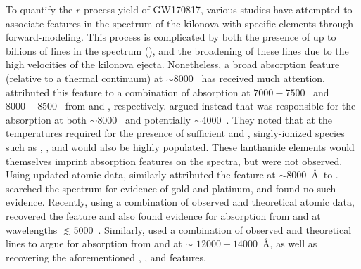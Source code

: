 \documentclass[twocolumn, twocolappendix]{aastex63}
\begin{document}
To quantify the $r$-process yield of GW170817, various studies have attempted to associate features in the spectrum of the kilonova with specific elements through forward-modeling. This process is complicated by both the presence of up to billions of lines in the spectrum (\citealt{tanaka20}), and the broadening of these lines due to the high velocities of the kilonova ejecta. Nonetheless, a broad absorption feature (relative to a thermal continuum) at $\sim$8000~\text{\AA} has received much attention. \cite{smartt17} attributed this feature to a combination of absorption at $7000-7500$~\text{\AA} and $8000-8500$~\text{\AA} from  and , respectively. \cite{watson19} argued instead that  was responsible for the absorption at both $\sim$8000~\text{\AA} and potentially $\sim$4000~\text{\AA}. They noted that at the temperatures required for the presence of sufficient  and , singly-ionized species such as , , and  would also be highly populated. These lanthanide elements would themselves imprint absorption features on the spectra, but were not observed. Using updated atomic data, \cite{domoto21} similarly attributed the feature at $\sim$8000~\AA~to . \cite{gillanders21} searched the spectrum for evidence of gold and platinum, and found no such evidence. Recently, using a combination of observed and theoretical atomic data, \cite{gillanders22} recovered the  feature and also found evidence for absorption from  and  at wavelengths $\lesssim$5000~\text{\AA}. Similarly, \cite{domoto22} used a combination of observed and theoretical lines to argue for absorption from  and  at $\sim$ $12000 - 14000$~\AA, as well as recovering the aforementioned , , and  features.
\end{document}
